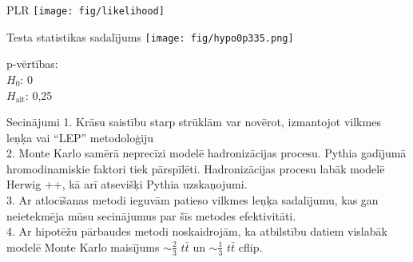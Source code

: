 \documentclass{beamer}
\begin{document}
\begin{frame}{PLR}
  \centering
  \texttt{[image: fig/likelihood]}
\end{frame}

\begin{frame}{Testa statistikas sadalījums}
  \centering
  \texttt{[image: fig/hypo0p335.png]}
  \begin{flushleft}
    p-vērtības:\\
    $H_{0}$: 0\\
    $H_{\text{alt}}$: 0,25
  \end{flushleft}
\end{frame}

\begin{frame}{Secinājumi}
  1. Krāsu saistību starp strūklām var novērot, izmantojot vilkmes leņķa vai ``LEP'' metodoloģiju\\
  2. Monte Karlo samērā neprecīzi modelē hadronizācijas procesu. Pythia gadījumā hromodinamiskie faktori tiek pārspīlēti. Hadronizācijas procesu labāk modelē Herwig ++, kā arī atsevišķi Pythia uzskaņojumi.\\
  3. Ar atlocīšanas metodi ieguvām patieso vilkmes leņķa sadalījumu, kas gan neietekmēja mūsu secinājumus par šīs metodes efektivitāti.\\
  4. Ar hipotēžu pārbaudes metodi noskaidrojām, ka atbilstību datiem vislabāk modelē Monte Karlo maisījums $\sim\frac{2}{3}$ $t\bar{t}$ un $\sim\frac{1}{3}$ $t\bar{t}$ cflip.
\end{frame}
\end{document}
